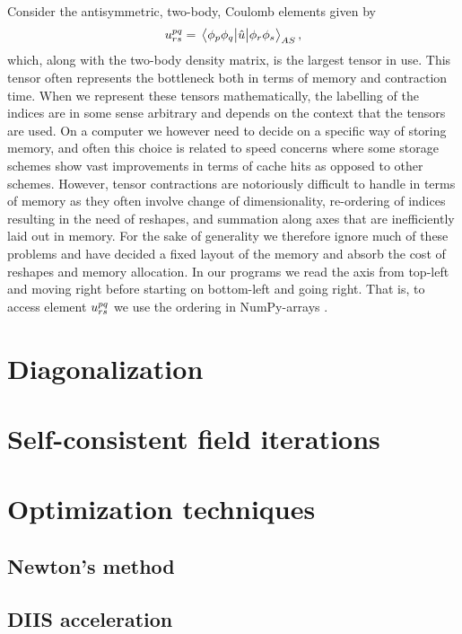         Consider the antisymmetric, two-body, Coulomb elements given by
        \begin{align}
            u^{pq}_{rs}
            = \mel{\phi_p\phi_q}{\hat{u}}{\phi_r\phi_s}_{AS},
        \end{align}
        which, along with the two-body density matrix, is the largest tensor in
        use.
        This tensor often represents the bottleneck both in terms of memory and
        contraction time.
        When we represent these tensors mathematically, the labelling of the
        indices are in some sense arbitrary and depends on the context that the
        tensors are used.
        On a computer we however need to decide on a specific way of storing
        memory, and often this choice is related to speed concerns where some
        storage schemes show vast improvements in terms of cache hits as opposed
        to other schemes.
        However, tensor contractions are notoriously difficult to handle in
        terms of memory as they often involve change of dimensionality,
        re-ordering of indices resulting in the need of reshapes, and summation
        along axes that are inefficiently laid out in memory.
        For the sake of generality we therefore ignore much of these problems
        and have decided a fixed layout of the memory and absorb the cost of
        reshapes and memory allocation.
        In our programs we read the axis from top-left and moving right before
        starting on bottom-left and going right.
        That is, to access element $u^{pq}_{rs}$ we use the ordering
         in NumPy-arrays \cite{numpy}.

    \section{Diagonalization}
    \section{Self-consistent field iterations}
    \section{Optimization techniques}
        \subsection{Newton's method}
        \subsection{DIIS acceleration}
